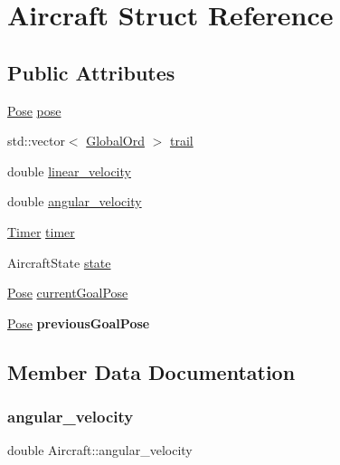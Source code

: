 \hypertarget{structAircraft}{}\section{Aircraft Struct Reference}
\label{structAircraft}
\subsection*{Public Attributes}
\begin{DoxyCompactItemize}
\item 
\hyperlink{structPose}{Pose} \hyperlink{structAircraft_ae974de419f4b2570b0d4416e5e5aeac3}{pose}
\item 
std\+::vector$<$ \hyperlink{structGlobalOrd}{Global\+Ord} $>$ \hyperlink{structAircraft_a5bb8eeef2d86c60fb64bb4d6b55ac594}{trail}
\item 
double \hyperlink{structAircraft_a892016ca5094e6c5bf0fb79c94310e76}{linear\+\_\+velocity}
\item 
double \hyperlink{structAircraft_a2047bb7d3321d300cc3afb2753ff0f49}{angular\+\_\+velocity}
\item 
\hyperlink{classTimer}{Timer} \hyperlink{structAircraft_a256a704e2dbf859d95d4eb28b0e02aa3}{timer}
\item 
Aircraft\+State \hyperlink{structAircraft_a2dbb23441b3d3565f223de5658eb868f}{state}
\item 
\hyperlink{structPose}{Pose} \hyperlink{structAircraft_a350988ee89dd6631da4e991844a98975}{current\+Goal\+Pose}
\item 
\mbox{\label{structAircraft_abd1deb6d69ea2e1ddf8fcc882092a728}} 
\hyperlink{structPose}{Pose} {\bfseries previous\+Goal\+Pose}
\end{DoxyCompactItemize}


\subsection{Member Data Documentation}
\mbox{\label{structAircraft_a2047bb7d3321d300cc3afb2753ff0f49}} 
\subsubsection{\texorpdfstring{angular\+\_\+velocity}{angular\_velocity}}
{\footnotesize\ttfamily double Aircraft\+::angular\+\_\+velocity}

